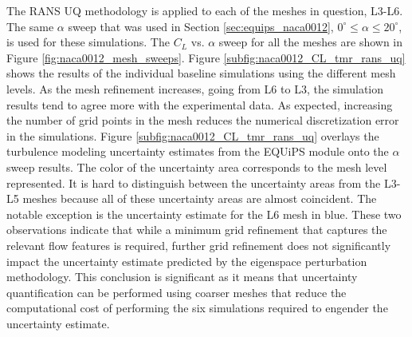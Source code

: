 The RANS UQ methodology is applied to each of the meshes in question, L3-L6.
The same $\alpha$ sweep that was used in Section \ref{sec:equips_naca0012}, $0^\circ \leq \alpha \leq 20^\circ$, is used for these simulations. 
The $C_L$ vs. $\alpha$ sweep for all the meshes are shown in Figure \ref{fig:naca0012_mesh_sweeps}. 
Figure \ref{subfig:naca0012_CL_tmr_rans_uq} shows the results of the individual baseline simulations using the different mesh levels. 
As the mesh refinement increases, going from L6 to L3, the simulation results tend to agree more with the experimental data. 
As expected, increasing the number of grid points in the mesh reduces the numerical discretization error in the simulations. 
Figure \ref{subfig:naca0012_CL_tmr_rans_uq} overlays the turbulence modeling uncertainty estimates from the EQUiPS module onto the $\alpha$ sweep results.
The color of the uncertainty area corresponds to the mesh level represented.
It is hard to distinguish between the uncertainty areas from the L3-L5 meshes because all of these uncertainty areas are almost coincident.
The notable exception is the uncertainty estimate for the L6 mesh in blue. 
These two observations indicate that while a minimum grid refinement that captures the relevant flow features is required, further grid refinement does not significantly impact the uncertainty estimate predicted by the eigenspace perturbation methodology.
This conclusion is significant as it means that uncertainty quantification can be performed using coarser meshes that reduce the computational cost of performing the six simulations required to engender the uncertainty estimate.

